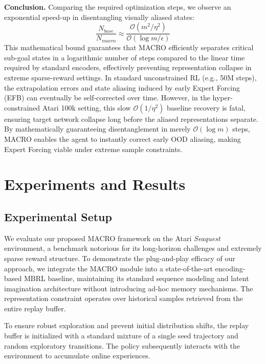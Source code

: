 \documentclass{article} %
\begin{document}
\textbf{Conclusion.}
Comparing the required optimization steps, we observe an exponential speed-up in disentangling visually aliased states:
\begin{equation}
\frac{N_{base}}{N_{macro}} \approx \frac{\mathcal{O}(m^2/\eta^2)}{\mathcal{O}(\log m/\epsilon)}
\end{equation}
This mathematical bound guarantees that MACRO efficiently separates critical sub-goal states in a logarithmic number of steps compared to the linear time required by standard encoders, effectively preventing representation collapse in extreme sparse-reward settings. In standard unconstrained RL (e.g., 50M steps), the extrapolation errors and state aliasing induced by early Expert Forcing (EFB) can eventually be self-corrected over time. However, in the hyper-constrained Atari 100k setting, this slow $\mathcal{O}(1/\eta^2)$ baseline recovery is fatal, ensuring target network collapse long before the aliased representations separate. By mathematically guaranteeing disentanglement in merely $\mathcal{O}(\log m)$ steps, MACRO enables the agent to instantly correct early OOD aliasing, making Expert Forcing viable under extreme sample constraints.

 

\section{Experiments and Results}

\subsection{Experimental Setup}
We evaluate our proposed MACRO framework on the Atari \textit{Seaquest} environment, a benchmark notorious for its long-horizon challenges and extremely sparse reward structure. To demonstrate the plug-and-play efficacy of our approach, we integrate the MACRO module into a state-of-the-art encoding-based MBRL baseline, maintaining its standard sequence modeling and latent imagination architecture without introducing ad-hoc memory mechanisms. The representation constraint operates over historical samples retrieved from the entire replay buffer.

To ensure robust exploration and prevent initial distribution shifts, the replay buffer is initialized with a standard mixture of a single seed trajectory and random exploratory transitions. The policy subsequently interacts with the environment to accumulate online experiences.
\end{document}
